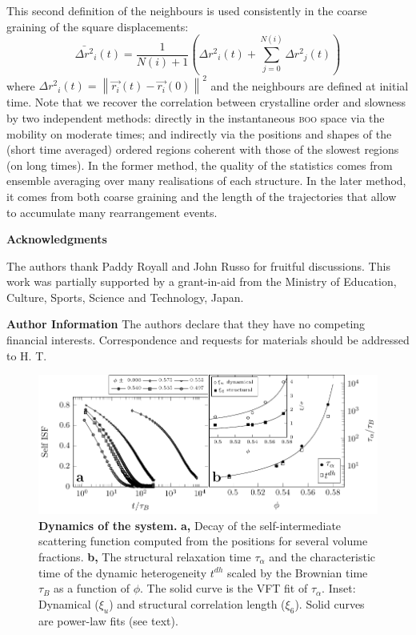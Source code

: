This second definition of the neighbours is used consistently in the coarse graining of the square displacements:
\begin{equation}
	\bar{\Delta r^2}_i(t) = \frac{1}{N(i)+1}\left( {\Delta r^2}_i(t) + \sum_{j=0}^{N(i)} {\Delta r^2}_j(t) \right) 
	\label{eq:Mu}
\end{equation}
where ${\Delta r^2}_i(t) = \left\|\vec{r_i}(t)-\vec{r_i}(0)\right\|^2$ and the neighbours are defined at initial time. Note that we recover the correlation between crystalline order and slowness by two independent methods: directly in the instantaneous \textsc{boo} space via the mobility on moderate times; and indirectly via the positions and shapes of the (short time averaged) ordered regions coherent with those of the slowest regions (on long times). In the former method, the quality of the statistics comes from ensemble averaging over many realisations of each structure. In the later method, it comes from both coarse graining and the length of the trajectories that allow to accumulate many rearrangement events.

%



\vspace{2cm}
\noindent
\textbf{Acknowledgments}

\noindent
The authors thank Paddy Royall and John Russo for fruitful discussions. 
This work was partially supported by a grant-in-aid from the 
Ministry of Education, Culture, Sports, Science and Technology, Japan. 

\sloppy
\noindent
{\bf Author Information} 
The authors declare that they have no competing financial interests. 
Correspondence and requests for materials should be addressed to 
H. T. 

\clearpage

\begin{figure}
\begin{center}
\includegraphics{generate_figures-figure0.pdf}
\end{center}
\caption{\textbf{Dynamics of the system.} {\bf a,} Decay of the self-intermediate scattering function computed from the positions for several volume fractions. {\bf b,} The structural relaxation time $\tau_\alpha$ and the characteristic time of the dynamic heterogeneity $t^{dh}$ scaled by the Brownian time $\tau_B$ as a function of $\phi$. The solid curve is the VFT fit of $\tau_\alpha$. Inset: Dynamical ($\xi_u$) and structural correlation length ($\xi_6$). Solid curves are power-law fits (see text).}
	\label{fig:vft}
\end{figure}

